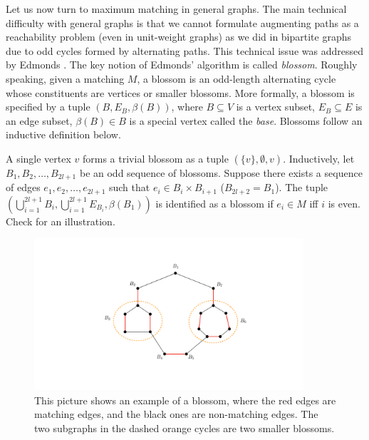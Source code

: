Let us now turn to maximum matching in general graphs. The main technical difficulty with general graphs is that we cannot formulate augmenting paths as a reachability problem (even in unit-weight graphs) as we did in bipartite graphs due to odd cycles formed by alternating paths. This technical issue was addressed by Edmonds \cite{edmonds1965paths}. The key notion of Edmonds' algorithm is called \emph{blossom}. Roughly speaking, given a matching $M$, a blossom is an odd-length alternating cycle whose constituents are vertices or smaller blossoms. More formally, a blossom is specified by a tuple $(B, E_B, \beta(B))$, where $B\subseteq V$ is a vertex subset, $E_B\subseteq E$ is an edge subset, $\beta(B)\in B$ is a special vertex called the \emph{base}. Blossoms follow an inductive definition below.

\begin{definition}
A single vertex $v$ forms a trivial blossom as a tuple $(\{v\}, \emptyset, v)$. Inductively, let $B_1, B_2, \ldots, B_{2l+1}$ be an odd sequence of blossoms. Suppose there exists a sequence of edges $e_1, e_2, \ldots, e_{2l+1}$ such that $e_i\in B_i\times B_{i+1}$ ($B_{2l+2} = B_1$). The tuple $\left(\bigcup_{i=1}^{2l+1}B_i, \bigcup_{i=1}^{2l+1}E_{B_i}, \beta(B_1)\right)$ is identified as a blossom if $e_i\in M$ iff $i$ is even. Check  for an illustration.
\end{definition}


\begin{figure}
	\centering
	\includegraphics[width=10cm]{fig/lecture_matching_blossom}
	\caption{This picture shows an example of a blossom, where the red edges are matching edges, and the black ones are non-matching edges. The two subgraphs in the dashed orange cycles are two smaller blossoms.}
	\label{fig:blossom}
\end{figure}

